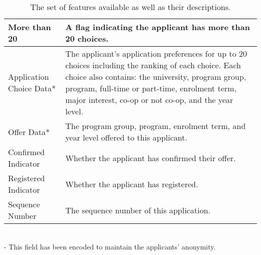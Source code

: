 \documentclass[titlepage]{article}
\begin{document}
\begin{table}[!hb]
\begin{center}
\begin{tabular}{| C{4cm} | C{10cm} |}
	More than 20					&A flag indicating the applicant has more than 20 choices.\\\hline
	Application Choice Data*		&The applicant's application preferences for up to 20 choices including the ranking of each choice. Each choice also contains: the university, program group, program, full-time or part-time, enrolment term, major interest, co-op or not co-op, and the year level.\\\hline
	Offer Data*						&The program group, program, enrolment term, and year level offered to this applicant.\\\hline
	Confirmed Indicator				&Whether the applicant has confirmed their offer.\\\hline
	Registered Indicator			&Whether the applicant has registered.\\\hline
	Sequence Number					&The sequence number of this application.\\\hline
\end{tabular}
\caption{ The set of features available as well as their descriptions.}
\end{center}
\end{table}
~\\
\small* - This field has been encoded to maintain the applicants' anonymity.

\vspace*{\fill}
\newpage
\end{document}
